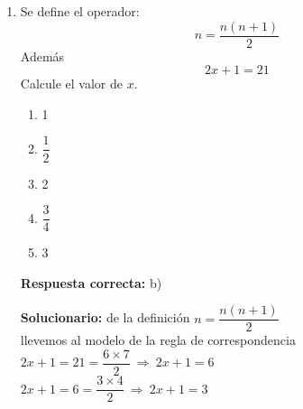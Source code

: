 \begin{enumerate}[resume]
\textbf{Respuesta correcta:} a)

\vspace{2mm}
\textbf{Solucionario:}

Sea el número de dos cifras $\overline{xy}$\\
$
xy-27 = yx\\
$
$
x-y = 3\\
$
$
\Rightarrow 10x+y-27 = 10y+x\\
$
$
10x-x+y-10y = 27\\
$
$
9x-9y = 27\\
$
$
x-y = 3\\
$
luego
$
\begin{aligned}
	x+y &= 9\\
	x-y &= 3\\ \hline
	2x &= 12
\end{aligned}
$\\
Donde: $x=6$, $y=3$, el número será 63,

entonces el producto es: $6 \times 3=$





\vspace{6mm}







\item  Se define el operador:
\[
\boxed{n}=\dfrac{n(n+1)}{2}
\]
Además
\[
\boxed{\boxed{\boxed{2x+1}}}=21
\]
Calcule el valor de $x$.

\begin{enumerate}[label=\alph*)]
	\item 1
	\item $\dfrac{1}{2}$
	\item 2
	\item $\dfrac{3}{4}$
	\item 3
\end{enumerate}

\textbf{Respuesta correcta:} b)

\vspace{2mm}
\textbf{Solucionario:}
de la definición $\boxed{n}=\dfrac{n(n+1)}{2}$\\
llevemos al modelo de la regla de correspondencia\\[1mm]
$\boxed{\boxed{\boxed{2x+1}}}=21=\dfrac{6\times 7}{2}\ \Rightarrow\ \boxed{\boxed{2x+1}}=6$\\

$\boxed{\boxed{2x+1}}=6=\dfrac{3\times 4}{2}\ \Rightarrow\ \boxed{2x+1}=3$\\


\end{enumerate}
